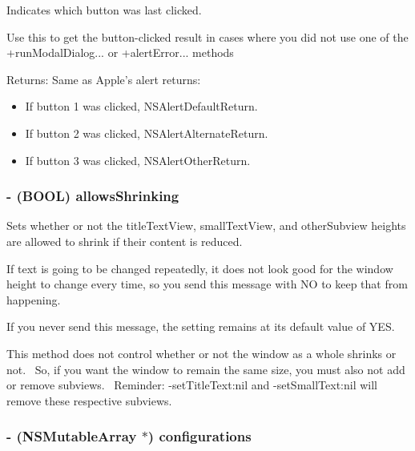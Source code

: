 Indicates which button was last clicked. 

Use this to get the button-clicked result in cases where you did not use one of the +runModalDialog... or +alertError... methods \begin{Desc}
\item[Returns:]Same as Apple's alert returns: \begin{itemize}
\item If button 1 was clicked, NSAlertDefaultReturn. \item If button 2 was clicked, NSAlertAlternateReturn. \item If button 3 was clicked, NSAlertOtherReturn. \end{itemize}
\end{Desc}
\hypertarget{interface_s_s_y_alert_67ba8d274d0cfa509a178ee291f60d6f}{
\subsubsection[{allowsShrinking}]{\setlength{\rightskip}{0pt plus 5cm}- (BOOL) allowsShrinking}}
\label{interface_s_s_y_alert_67ba8d274d0cfa509a178ee291f60d6f}


Sets whether or not the titleTextView, smallTextView, and otherSubview heights are allowed to shrink if their content is reduced. 

If text is going to be changed repeatedly, it does not look good for the window height to change every time, so you send this message with NO to keep that from happening.

If you never send this message, the setting remains at its default value of YES.

This method does not control whether or not the window as a whole shrinks or not.~ So, if you want the window to remain the same size, you must also not add or remove subviews.~ Reminder: -setTitleText:nil and -setSmallText:nil will remove these respective subviews. \hypertarget{interface_s_s_y_alert_e78e0ec0ccc4588e3fed7e25813b2e94}{
\subsubsection[{configurations}]{\setlength{\rightskip}{0pt plus 5cm}- (NSMutableArray $\ast$) configurations}}
\label{interface_s_s_y_alert_e78e0ec0ccc4588e3fed7e25813b2e94}


